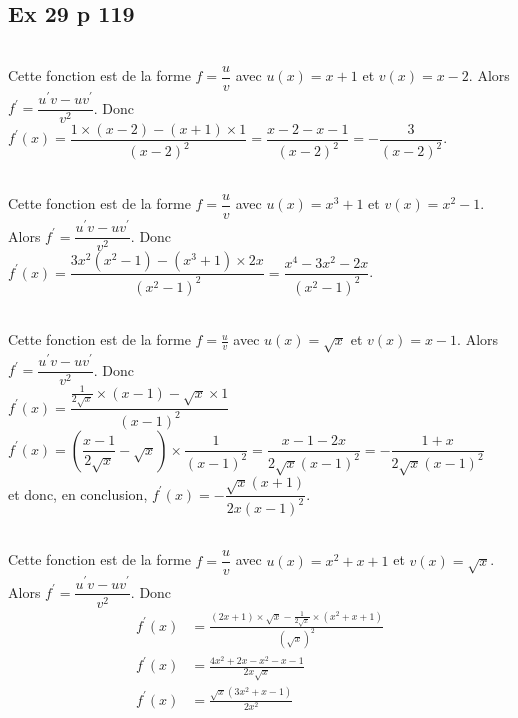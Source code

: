 \documentclass[12pt,a4paper]{book}
\begin{document}
\subsection*{Ex 29 p 119}
\begin{enumMet}
    \item {}\\
    Cette fonction est de la forme $f=\dfrac{u}{v}$ avec $u(x)=x+1$ et $v(x)=x-2$. Alors $f^{\prime}=\dfrac{u^{\prime} v-u v^{\prime}}{v^{2}}$. Donc \\ 
    $ f^{\prime}(x)=\dfrac{1 \times(x-2)-(x+1) \times 1}{(x-2)^{2}}=\dfrac{x-2-x-1}{(x-2)^{2}}=-\dfrac{3}{(x-2)^{2}}$.
    \item {}\\
    Cette fonction est de la forme $f=\dfrac{u}{v}$ avec $u(x)=x^{3}+1$ et $v(x)=x^{2}-1$. Alors $f^{\prime}=\dfrac{u^{\prime} v-u v^{\prime}}{v^{2}}$. Donc \\
    $f^{\prime}(x)=\dfrac{3 x^{2}\left(x^{2}-1\right)-\left(x^{3}+1\right) \times 2 x}{\left(x^{2}-1\right)^{2}}=\dfrac{x^{4}-3 x^{2}-2 x}{\left(x^{2}-1\right)^{2}}$.
    \item {}\\
    Cette fonction est de la forme $f=\frac{u}{v}$ avec $u(x)=\sqrt{x}$ et $v(x)=x-1$. Alors $f^{\prime}=\dfrac{u^{\prime} v-u v^{\prime}}{v^{2}}$. Donc \\
    $f^{\prime}(x)=\dfrac{\frac{1}{2 \sqrt{x}} \times(x-1)-\sqrt{x} \times 1}{(x-1)^{2}}$\\
    $f^{\prime}(x)=\left(\dfrac{x-1}{2 \sqrt{x}}-\sqrt{x}\right) \times \dfrac{1}{(x-1)^{2}}=\dfrac{x-1-2 x}{2 \sqrt{x}(x-1)^{2}}=-\dfrac{1+x}{2 \sqrt{x}(x-1)^{2}}$\\
    et donc, en conclusion, $f^{\prime}(x)=-\dfrac{\sqrt{x}(x+1)}{2 x(x-1)^{2}}$.
    \item {}\\
    Cette fonction est de la forme $f=\dfrac{u}{v}$ avec $u(x)=x^{2}+x+1$ et $v(x)=\sqrt{x}$. Alors  $f^{\prime}=\dfrac{u^{\prime} v-u v^{\prime}}{v^{2}}$. Donc \\
    $$
    \begin{aligned}
    f^{\prime}(x)&=\frac{(2 x+1) \times \sqrt{x}-\frac{1}{2 \sqrt{x}} \times\left(x^{2}+x+1\right)}{(\sqrt{x})^{2}} \\
    f^{\prime}(x)&=\frac{4 x^{2}+2 x-x^{2}-x-1}{2 x \sqrt{x}} \\
    f^{\prime}(x)&=\frac{\sqrt{x}\left(3 x^{2}+x-1\right)}{2 x^{2}}
    \end{aligned}
    $$
\end{enumMet}
\end{document}
